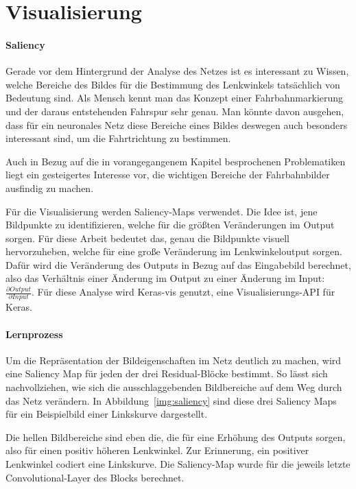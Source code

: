 \section{Visualisierung}

\paragraph{Saliency}
Gerade vor dem Hintergrund der Analyse des Netzes  ist es interessant zu Wissen, welche Bereiche des Bildes für die Bestimmung des Lenkwinkels tatsächlich von Bedeutung sind. Als Mensch kennt man das Konzept einer Fahrbahnmarkierung und der daraus entstehenden Fahrspur sehr genau. Man könnte davon ausgehen, dass für ein neuronales Netz diese Bereiche eines Bildes deswegen auch besonders interessant sind, um die Fahrtrichtung zu bestimmen.

Auch in Bezug auf die in vorangegangenem Kapitel besprochenen Problematiken liegt ein gesteigertes Interesse vor, die wichtigen Bereiche der Fahrbahnbilder ausfindig zu machen.

Für die Visualisierung werden Saliency-Maps  \cite{simonyan2013deep} verwendet. Die Idee ist, jene Bildpunkte zu identifizieren, welche für die größten Veränderungen im Output sorgen. Für diese Arbeit bedeutet das, genau die Bildpunkte visuell hervorzuheben, welche für eine große Veränderung im Lenkwinkeloutput sorgen. Dafür wird die Veränderung des Outputs in Bezug auf das Eingabebild berechnet, also das Verhältnis einer Änderung im Output zu einer Änderung im Input: $\frac{\partial Output}{\partial Input}$. Für diese Analyse wird Keras-vis  genutzt, eine Visualisierungs-API für Keras.

\paragraph{Lernprozess}
Um die Repräsentation der Bildeigenschaften im Netz deutlich zu machen, wird eine Saliency Map für jeden der drei Residual-Blöcke bestimmt. So lässt sich nachvollziehen, wie sich die ausschlaggebenden Bildbereiche auf dem Weg durch das Netz verändern. In Abbildung~\ref{img:saliency} sind diese drei Saliency Maps für ein Beispielbild einer Linkskurve dargestellt.

Die hellen Bildbereiche sind eben die, die für eine Erhöhung des Outputs sorgen, also für einen positiv höheren Lenkwinkel. Zur Erinnerung, ein positiver Lenkwinkel codiert eine Linkskurve. Die Saliency-Map wurde für die jeweils letzte Convolutional-Layer des Blocks berechnet. 

